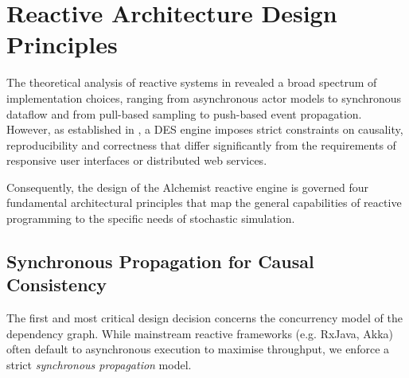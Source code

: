 \section{Reactive Architecture Design Principles}\label{sec:design_principles}

The theoretical analysis of reactive systems in 
revealed a broad spectrum of implementation choices, ranging from asynchronous
actor models to synchronous dataflow and from pull-based sampling to
push-based event propagation. However, as established in , a
\ac{DES} engine imposes strict constraints on causality, reproducibility and
correctness that differ significantly from the requirements of responsive user
interfaces or distributed web services.

Consequently, the design of the Alchemist reactive engine is governed four
fundamental architectural principles that map the general capabilities of
reactive programming to the specific needs of stochastic simulation.

\subsection{Synchronous Propagation for Causal Consistency}
The first and most critical design decision concerns the concurrency model of
the dependency graph. While mainstream reactive frameworks (e.g. RxJava, Akka)
often default to asynchronous execution to maximise throughput, we enforce a
strict \emph{synchronous propagation} model.

